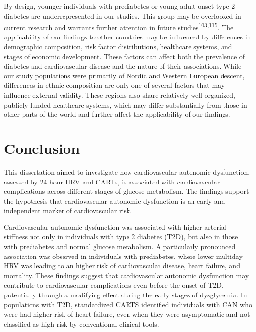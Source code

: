 \documentclass[
  a4paper,
  headsepline=true,
  open=any]{scrbook}
\begin{document}
By design, younger individuals with prediabetes or young-adult-onset
type 2 diabetes are underrepresented in our studies. This group may be
overlooked in current research and warrants further attention in future
studies\textsuperscript{103,115}. The applicability of our findings to
other countries may be influenced by differences in demographic
composition, risk factor distributions, healthcare systems, and stages
of economic development. These factors can affect both the prevalence of
diabetes and cardiovascular disease and the nature of their
associations. While our study populations were primarily of Nordic and
Western European descent, differences in ethnic composition are only one
of several factors that may influence external validity. These regions
also share relatively well-organized, publicly funded healthcare
systems, which may differ substantially from those in other parts of the
world and further affect the applicability of our findings.


\hypertarget{conclusion}{%
\chapter{Conclusion}\label{conclusion}}

This dissertation aimed to investigate how cardiovascular autonomic
dysfunction, assessed by 24-hour HRV and CARTs, is associated with
cardiovascular complications across different stages of glucose
metabolism. The findings support the hypothesis that cardiovascular
autonomic dysfunction is an early and independent marker of
cardiovascular risk.

Cardiovascular autonomic dysfunction was associated with higher arterial
stiffness not only in individuals with type 2 diabetes (T2D), but also
in those with prediabetes and normal glucose metabolism. A particularly
pronounced association was observed in individuals with prediabetes,
where lower multiday HRV was leading to an higher risk of cardiovascular
disease, heart failure, and mortality. These findings suggest that
cardiovascular autonomic dysfunction may contribute to cardiovascular
complications even before the onset of T2D, potentially through a
modifying effect during the early stages of dysglycemia. In populations
with T2D, standardized CARTS identified individuals with CAN who were
had higher risk of heart failure, even when they were asymptomatic and
not classified as high risk by conventional clinical tools.
\end{document}
